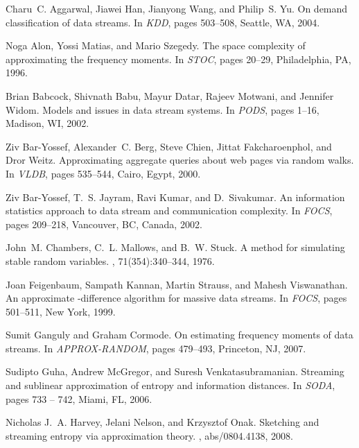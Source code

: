 \documentclass{sig-alternate}
\begin{document}
\begin{thebibliography}{10}

Charu~C. Aggarwal, Jiawei Han, Jianyong Wang, and Philip~S. Yu.
\newblock On demand classification of data streams.
\newblock In {\em KDD}, pages 503--508, Seattle, WA, 2004.

Noga Alon, Yossi Matias, and Mario Szegedy.
\newblock The space complexity of approximating the frequency moments.
\newblock In {\em STOC}, pages 20--29, Philadelphia, PA, 1996.

Brian Babcock, Shivnath Babu, Mayur Datar, Rajeev Motwani, and Jennifer Widom.
\newblock Models and issues in data stream systems.
\newblock In {\em PODS}, pages 1--16, Madison, WI, 2002.

Ziv Bar-Yossef, Alexander~C. Berg, Steve Chien, Jittat Fakcharoenphol, and Dror
  Weitz.
\newblock Approximating aggregate queries about web pages via random walks.
\newblock In {\em VLDB}, pages 535--544, Cairo, Egypt, 2000.

Ziv Bar-Yossef, T.~S. Jayram, Ravi Kumar, and D.~Sivakumar.
\newblock An information statistics approach to data stream and communication
  complexity.
\newblock In {\em FOCS}, pages 209--218, Vancouver, BC, Canada, 2002.

John~M. Chambers, C.~L. Mallows, and B.~W. Stuck.
\newblock A method for simulating stable random variables.
,
  71(354):340--344, 1976.

Joan Feigenbaum, Sampath Kannan, Martin Strauss, and Mahesh Viswanathan.
\newblock An approximate -difference algorithm for massive data streams.
\newblock In {\em FOCS}, pages 501--511, New York, 1999.

Sumit Ganguly and Graham Cormode.
\newblock On estimating frequency moments of data streams.
\newblock In {\em APPROX-RANDOM}, pages 479--493, Princeton, NJ, 2007.

Sudipto Guha, Andrew McGregor, and Suresh Venkatasubramanian.
\newblock Streaming and sublinear approximation of entropy and information
  distances.
\newblock In {\em SODA}, pages 733 -- 742, Miami, FL, 2006.

Nicholas J.~A. Harvey, Jelani Nelson, and Krzysztof Onak.
\newblock Sketching and streaming entropy via approximation theory.
, abs/0804.4138, 2008.


\end{thebibliography}
\end{document}
